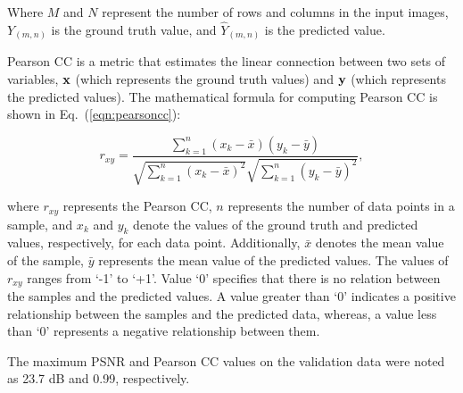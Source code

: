 Where \(M\) and \(N\) represent the number of rows and columns in the input 
images, $Y_{(m, n)}$ is the ground truth value, and $\hat{Y}_{(m, n)}$ is the 
predicted value.

Pearson CC is a metric that estimates the linear connection between two sets of variables, \(\mathbf{x}\) (which represents the ground truth values) and \(\mathbf{y}\) (which represents the predicted values). 
The mathematical formula for computing Pearson CC is shown in Eq.~(\ref{eqn:pearsoncc}):

\begin{equation}
	r_{x 
		y}=\frac{\sum_{k=1}^n\left(x_k-\bar{x}\right)\left(y_k-\bar{y}\right)}{\sqrt{\sum_{k=1}^n\left(x_k-\bar{x}\right)^2}
		\sqrt{\sum_{k=1}^n\left(y_k-\bar{y}\right)^2}},
	\label{eqn:pearsoncc}
\end{equation}

where $r_{xy}$ represents the Pearson CC, \(n\) represents the number of data points in a sample, and $x_k$ and $y_k$ denote the values of the ground truth and predicted values, respectively, for each data point. 
Additionally, $\bar{x}$ denotes the mean value of the sample, $\bar{y}$ represents the mean value of the predicted values. 
The values of $r_{xy}$ ranges from ‘-1’ to ‘+1’. 
Value ‘0’ specifies that there is no relation between the samples and the predicted values. 
A value greater than ‘0’ indicates a positive relationship between the samples and the predicted data, whereas, a value less than ‘0’ represents a negative relationship between them.

The maximum PSNR and Pearson CC values on the validation data were noted as 23.7 dB and 0.99, respectively.
